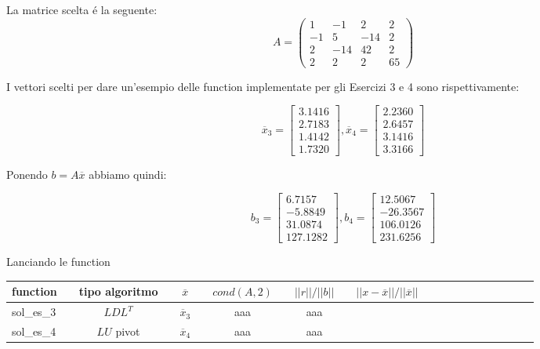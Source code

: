 \begin{center}
\footnotesize\noindent{}\end{center}

\noindent La matrice scelta \'e la seguente:
\[
A = \begin{pmatrix} 1 & -1 & 2 & 2 \\ -1 & 5 & -14 & 2\\ 2 & -14 & 42 & 2\\ 2 & 2 & 2 & 65 \end{pmatrix}
\]

\noindent I vettori scelti per dare un'esempio delle function implementate per gli Esercizi 3 e 4 sono rispettivamente:

\[
\overline{x}_3 = \begin{bmatrix} 3.1416 \\ 2.7183 \\ 1.4142 \\ 1.7320 \end{bmatrix},
\overline{x}_4 = \begin{bmatrix} 2.2360 \\ 2.6457 \\ 3.1416 \\ 3.3166 \end{bmatrix}
\]

\noindent Ponendo \(b=A\overline{x}\) abbiamo quindi:

\[
b_3 = \begin{bmatrix} 6.7157 \\ -5.8849 \\ 31.0874 \\ 127.1282 \end{bmatrix},
b_4 = \begin{bmatrix} 12.5067 \\ -26.3567 \\ 106.0126 \\ 231.6256 \end{bmatrix}
\]

\noindent Lanciando le function
\\
\begin{tabular}{l*{20}{c}}
function & \vline& tipo algoritmo & \vline& \(\overline{x}\) & \vline& \(cond(A, 2)\) & \vline& \(||r||/||b||\) & \vline& \(||x-\overline{x}||/||\overline{x}||\) \\
\hline
sol\_es\_3 & \vline& \(LDL^T\)    & \vline& \(\overline{x}_3\) & \vline& aaa      & \vline& aaa	 \\
sol\_es\_4 & \vline& \(LU\) pivot & \vline& \(\overline{x}_4\) & \vline& aaa      & \vline& aaa	 \\

\end{tabular} \\


